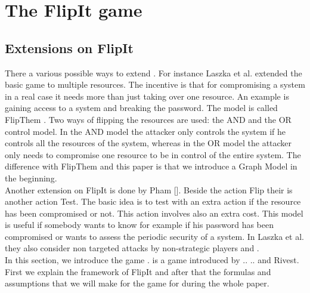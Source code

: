 \chapter{The FlipIt game}
\label{cha:2}


\section{Extensions on FlipIt}


There a various possible ways to extend . For instance Laszka et al. extended the basic  game to multiple resources. The incentive is that for compromising a system in a real case it needs more than just taking over one resource. An example is gaining access to a system and breaking the password. The model is called FlipThem \cite{FlipThem}. Two ways of flipping the resources are used: the AND and the OR control model. In the AND model the attacker only controls the system if he controls all the resources of the system, whereas in the OR model the attacker only needs to compromise one resource to be in control of the entire system. The difference with FlipThem and this paper is that we introduce a Graph Model in the beginning.\\
Another extension on FlipIt is done by Pham\cite{GameTheorApprCostBenefitAnalyses} []. Beside the action Flip their is another action Test. The basic idea is to test with an extra action if the resource has been compromised or not. This action involves also an extra cost. This model is useful if somebody wants to know for example if his password has been compromised or wants to assess the periodic security of a system.  In \cite{MitigationCovert} \cite{MitigationNonTargeted} Laszka et al. they also consider non targeted attacks by non-strategic players and . \\

In this section, we introduce the game  \cite{FlipIt}.  is a game introduced by .. .. and Rivest. First we explain the framework of FlipIt and after that the formulas and assumptions that we will make for the game for during the whole paper.  

